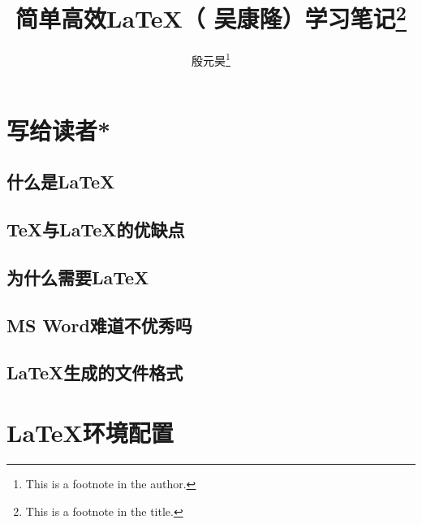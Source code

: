 \documentclass{ctexart}
\title{简单高效\LaTeX（ 吴康隆）学习笔记\thanks{This is a footnote in the title.}}
\author{殷元昊\thanks{This is a footnote in the author.}}
\date{}
\begin{document}
\maketitle

\renewcommand{\contentsname}{这是目录}
\tableofcontents

\renewcommand{\listfigurename}{这是插图目录}
\listoffigures

\renewcommand{\listtablename}{这是表格目录}
\listoftables

\section{写给读者*}
    \subsection{什么是\LaTeX}
    \subsection{\TeX 与\LaTeX 的优缺点}
    \subsection{为什么需要\LaTeX}
    \subsection{MS Word难道不优秀吗}
    \subsection{\LaTeX 生成的文件格式}

\section{\LaTeX 环境配置}
\end{document}
